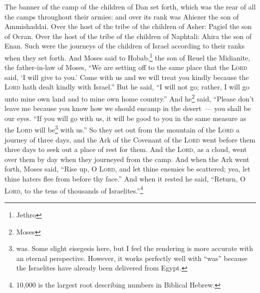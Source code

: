 \begin{enumerate}[align=center]
     The banner of the camp of the children of Dan set forth, which was the rear of all the camps throughout their armies: and over its rank was Ahiezer the son of Ammishaddai.%
     Over the host of the tribe of the children of Asher: Pagiel the son of Ocran.%
     Over the host of the tribe of the children of Naphtali: Ahira the son of Enan.%
     Such were the journeys of the children of Israel according to their ranks when they set forth.%
     And Moses said to Hobab.\footnote{Jethro} the son of Reuel the Midianite, the father-in-law of Moses, ``We are setting off to the same place that the \textsc{Lord} said, `I will give to you.' Come with us and we will treat you kindly because the \textsc{Lord} hath dealt kindly with Israel.''%
     But he said, ``I will not go; rather, I will go unto mine own land and to mine own home country.''%
     And he\footnote{Moses} said, ``Please don't leave me because you know how we should encamp in the desert~--- you shall be our eyes.%
     ``If you will go with us, it will be good to you in the same measure as the \textsc{Lord} will be\footnote{was. Some slight eisegesis here, but I feel the rendering is more accurate with an eternal perspective. However, it works perfectly well with ``was'' because the Israelites have already been delivered from Egypt.} with us.''%
     So they set out from the mountain of the \textsc{Lord} a journey of three days, and the Ark of the Covenant of the \textsc{Lord} went before them three days to seek out a place of rest for them.%
     And the \textsc{Lord}, as a cloud, went over them by day when they journeyed from the camp.%
     And when the Ark went forth, Moses said, ``Rise up, O \textsc{Lord}, and let thine enemies be scattered; yea, let thine haters flee from before thy face.''%
     And when it rested he said, ``Return, O \textsc{Lord}, to the tens of thousands of Israelites.''\footnote{10,000 is the largest root describing numbers in Biblical Hebrew.}%
\end{enumerate}
